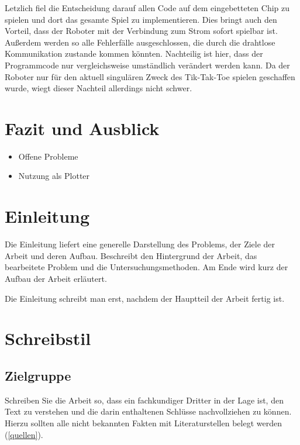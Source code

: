 \documentclass[conference,compsoc,final,a4paper]{IEEEtran}
\begin{document}
Letzlich fiel die Entscheidung darauf allen Code auf dem eingebetteten Chip zu spielen und dort
das gesamte Spiel zu implementieren. Dies bringt auch den Vorteil, dass der Roboter mit der Verbindung
zum Strom sofort spielbar ist. Außerdem werden so alle Fehlerfälle ausgeschlossen, die durch die
drahtlose Kommunikation zustande kommen könnten. Nachteilig ist hier, dass der Programmcode nur
vergleichsweise umständlich verändert werden kann. Da der Roboter nur für den aktuell singulären
Zweck des Tik-Tak-Toe spielen geschaffen wurde, wiegt dieser Nachteil allerdings nicht schwer.


\section{Fazit und Ausblick}
\begin{itemize}
  \item Offene Probleme
  \item Nutzung als Plotter
\end{itemize}

\section{Einleitung}
Die Einleitung liefert eine generelle Darstellung des Problems, der Ziele der Arbeit und deren Aufbau. Beschreibt den Hintergrund der Arbeit, das bearbeitete Problem und die Untersuchungsmethoden. Am Ende wird kurz der Aufbau der Arbeit erläutert.

Die Einleitung schreibt man erst, nachdem der Hauptteil der Arbeit fertig ist.

\section{Schreibstil}
\subsection{Zielgruppe}
Schreiben Sie die Arbeit so, dass ein fachkundiger Dritter in der Lage ist, den Text zu verstehen und die darin enthaltenen Schlüsse nachvollziehen zu können. Hierzu sollten alle nicht bekannten Fakten mit Literaturstellen belegt werden (\autoref{quellen}).
\end{document}
